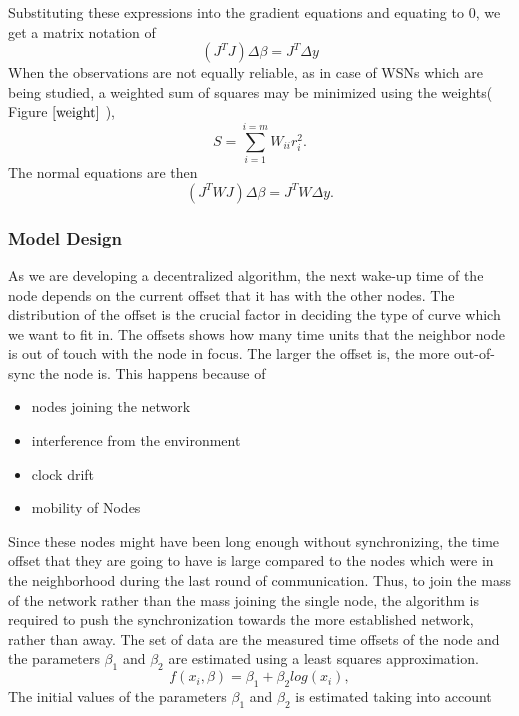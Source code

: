 \documentclass[a4paper,10pt]{report}
\begin{document}
Substituting these expressions into the gradient equations and
equating to $0$, we get a matrix notation of
\begin{equation}
    \left(J^TJ\right)\Delta  \beta=J^T\Delta y
\end{equation}
When the observations are not equally reliable, as in case of WSNs
which are being studied, a weighted sum of squares may be minimized
using the weights( Figure $\ref{weight}$ ),
\begin{equation}
    S=\sum_{i=1}^{i=m}W_{ii}r_i^2.
\end{equation}
The normal equations are then
\begin{equation}
    \left(J^TWJ\right)\Delta  \beta=J^TW\Delta y.
\end{equation}
\subsubsection{Model Design}
As we are developing a decentralized algorithm, the
next wake-up time of the node depends on the current offset that it
has with the other nodes. The distribution of the offset is the
crucial factor in deciding the type of curve which we want to fit
in. The offsets shows how many time units that the neighbor node is
out of touch with the node in focus. The larger the offset is, the
more out-of-sync the node is. This happens because of
\begin{itemize}
\item nodes joining the network
\item interference from the environment
\item clock drift
\item mobility of Nodes
\end{itemize}
Since these nodes might have been long enough without synchronizing,
the time offset that they are going to have is large compared to the
nodes which were in the neighborhood during the last round of
communication. Thus, to join the mass of the network rather than the
mass joining the single node, the algorithm is required to push the
synchronization towards the more established network, rather than
away.\newline
The set of data are the measured time offsets of the node and the
parameters $\beta_1$ and $\beta_2$ are estimated using a least
squares approximation.
\begin{equation}
 f(x_i,\beta)= \beta _1 + \beta_2log(x_i),
\end{equation}
The initial values of the parameters $\beta_1$ and $\beta_2$ is estimated taking into account
\end{document}
